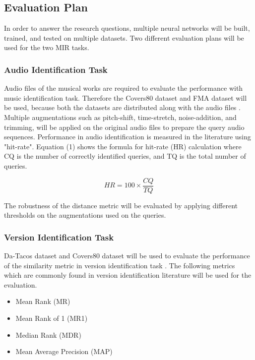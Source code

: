 \documentclass[../main.tex]{subfiles}
\begin{document}
\subsection{Evaluation Plan}
In order to answer the research questions, multiple neural networks will be built, trained, and tested on multiple datasets. Two different evaluation plans will be used for the two \gls{MIR} tasks.

\subsubsection{Audio Identification Task}
Audio files of the musical works are required to evaluate the performance with music identification task. Therefore the Covers80 dataset and FMA dataset will be used, because both the datasets are distributed along with the audio files \cite{Covers80CoverSong,defferrardFMADatasetMusic2017}. Multiple augmentations such as pitch-shift, time-stretch, noise-addition, and trimming, will be applied on the original audio files to prepare the query audio sequences. Performance in audio identification is measured in the literature using "hit-rate". Equation (1) shows the formula for hit-rate (HR) calculation where CQ is the number of correctly identified queries, and TQ is the total number of queries.

\begin{equation}
    HR = 100 \times \frac{CQ}{TQ}
\end{equation}

\par
The robustness of the distance metric will be evaluated by applying different thresholds on the augmentations used on the queries.


\subsubsection{Version Identification Task}
Da-Tacos dataset and Covers80 dataset will be used to evaluate the performance of the similarity metric in version identification task \cite{yesilerDaTACOSDatasetCover2019,Covers80CoverSong}. The following metrics which are commonly found in version identification literature will be used for the evaluation.
\begin{itemize}
    \item Mean Rank (MR)
    \item Mean Rank of 1 (MR1)
    \item Median Rank (MDR)
    \item Mean Average Precision (MAP)
\end{itemize}
\end{document}
